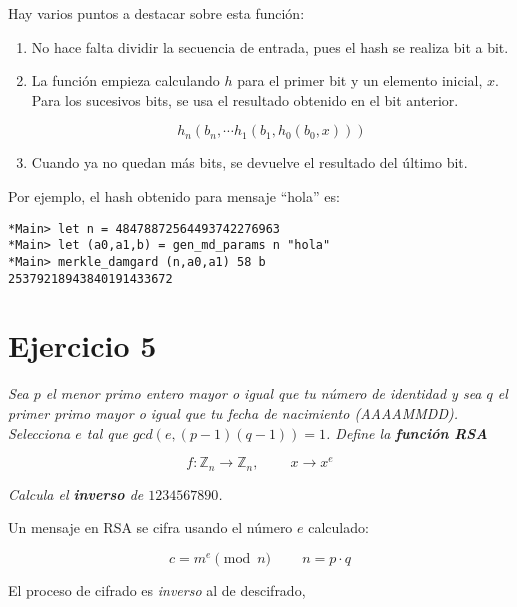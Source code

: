 \documentclass[10pt,spanish]{article}
\begin{document}
Hay varios puntos a destacar sobre esta función:

\begin{enumerate}[\color{azul}{$\longrightarrow$}]
    \item No hace falta dividir la secuencia de entrada, pues el hash se realiza bit a bit.
    \item La función empieza calculando $h$ para el primer bit y un elemento inicial, $x$. Para los sucesivos bits, se usa el resultado obtenido en el bit anterior.

    \begin{displaymath}
        h_n (b_n, \cdots h_1(b_1, h_0(b_0, x)))
    \end{displaymath}

    \item Cuando ya no quedan más bits, se devuelve el resultado del último bit.
\end{enumerate}

Por ejemplo, el hash obtenido para mensaje ``hola'' es:

\begin{verbatim}
*Main> let n = 48478872564493742276963
*Main> let (a0,a1,b) = gen_md_params n "hola"
*Main> merkle_damgard (n,a0,a1) 58 b
25379218943840191433672
\end{verbatim}

\section{\textcolor{azul}Ejercicio 5}
\textit{Sea $p$ el menor primo entero mayor o igual que tu número de identidad y sea $q$ el primer primo mayor o igual que tu fecha de nacimiento (AAAAMMDD). Selecciona $e$ tal que $gcd(e, (p-1)(q-1)) = 1$. Define la \textcolor{azul}{\textbf{función RSA}}}

\begin{displaymath}
    f: \mathbb{Z}_n \rightarrow \mathbb{Z}_n, \qquad\ x \rightarrow x^e
\end{displaymath}

\textit{Calcula el \textbf{\textcolor{azul}{inverso}} de $1234567890$.
}

Un mensaje en RSA se cifra usando el número $e$ calculado:

\begin{displaymath}
    c = m^e \pmod n \qquad\ n = p\cdot q
\end{displaymath}

El proceso de cifrado es \textit{\textcolor{azul}{inverso}} al de descifrado,
\end{document}
